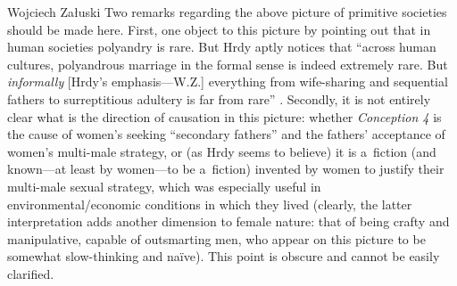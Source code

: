 \begin{artengenv}{Wojciech Załuski}
Two remarks regarding the above picture of primitive societies should be made here. First, one object to this picture by pointing out that in human societies polyandry is rare. But Hrdy aptly notices that ``across human cultures, polyandrous marriage in the formal sense is indeed extremely rare. But \textit{informally} [Hrdy's emphasis---W.Z.] everything from wife-sharing and sequential fathers to surreptitious adultery is far from rare''
\parencite[][pp.xxii--xxiii]{hrdy_woman_1999}. %
 Secondly, it is not entirely clear what is the direction of causation in this picture: whether \textit{Conception 4} is the cause of women's seeking ``secondary fathers'' and the fathers' acceptance of women's multi-male strategy, or (as Hrdy seems to believe) it is a~fiction (and known---at least by women---to be a~fiction) invented by women to justify their multi-male sexual strategy, which was especially useful in environmental/economic conditions in which they lived (clearly, the latter interpretation adds another dimension to female nature: that of being crafty and manipulative, capable of outsmarting men, who appear on this picture to be somewhat slow-thinking and naïve). This point is obscure and cannot be easily clarified.


\end{artengenv}
